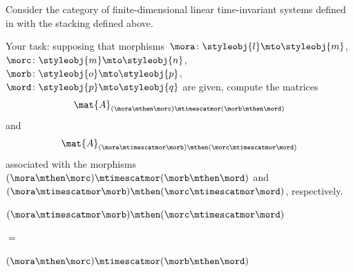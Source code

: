 \begin{gradedexercise}
    \label{ex:StackingLTI}

    Consider the category of finite-dimensional linear time-invariant systems defined in  with the stacking defined above.

    Your task:
    supposing that morphisms~$\mora\colon \styleobj{l}\mto \styleobj{m}$,~$\morc\colon \styleobj{m}\mto \styleobj{n}$,~$\morb\colon \styleobj{o}\mto \styleobj{p}$,~$\mord\colon \styleobj{p}\mto \styleobj{q}$ are given, compute the matrices
    \begin{equation}
        \mat{A}_{(\mora \mthen \morc)\mtimescatmor (\morb\mthen \mord)}
    \end{equation}
    and
    \begin{equation}
        \mat{A}_{(\mora\mtimescatmor \morb)\mthen (\morc\mtimescatmor \mord)}
    \end{equation}
    associated with the morphisms $(\mora \mthen \morc)\mtimescatmor (\morb\mthen \mord)$ and $(\mora\mtimescatmor \morb)\mthen (\morc\mtimescatmor \mord)$, respectively.
\end{gradedexercise}


\begin{marginfigure}
    \centering
    $(\mora \mtimescatmor \morb )
        \mthen (\morc \mtimescatmor \mord )$

    \vspace{3mm}

    $=$

    \vspace{3mm}
    \vspace{3mm}
    $(\mora \mthen \morc ) \mtimescatmor (\morb \mthen \mord )$

    \caption{Commutation of stacking and composition in a functorial stacking . }
    \label{fig:stacking-functorial}
\end{marginfigure}

%

